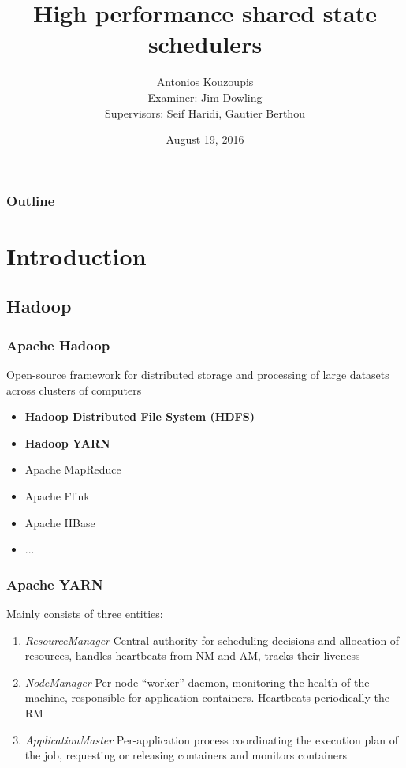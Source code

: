 \documentclass{beamer}
\title{High performance shared state schedulers}
\author[AK]{Antonios Kouzoupis\\[1em]{\footnotesize Examiner: Jim
    Dowling\\Supervisors: Seif Haridi, Gautier Berthou}}
\institute[KTH/SICS]{}
\date[date]{August 19, 2016}
\begin{document}
\section{}
\begin{frame}
\titlepage
\end{frame}

\section*{}
\begin{frame}
\frametitle{Outline}
\footnotesize
\tableofcontents
\normalsize
\end{frame}

\section{Introduction}
\subsection{Hadoop}
\begin{frame}
\frametitle{Apache Hadoop}
Open-source framework for distributed storage and processing of large
datasets across clusters of computers
\begin{itemize}
\item \textbf{Hadoop Distributed File System (HDFS)}
\item \textbf{Hadoop YARN}
\item Apache MapReduce
\item Apache Flink
\item Apache HBase
\item ...
\end{itemize}
\end{frame}

\begin{frame}
\frametitle{Apache YARN}
Mainly consists of three entities:
\begin{enumerate}
\item<+-> \emph{ResourceManager} Central authority for scheduling
  decisions and allocation of resources, handles heartbeats from NM
  and AM, tracks their liveness

\item<+-> \emph{NodeManager} Per-node ``worker'' daemon, monitoring the
  health of the machine, responsible for application
  containers. Heartbeats periodically the RM

\item<+-> \emph{ApplicationMaster} Per-application process
  coordinating the execution plan of the job, requesting or releasing
  containers and monitors containers
\end{enumerate}
\end{frame}
\end{document}
